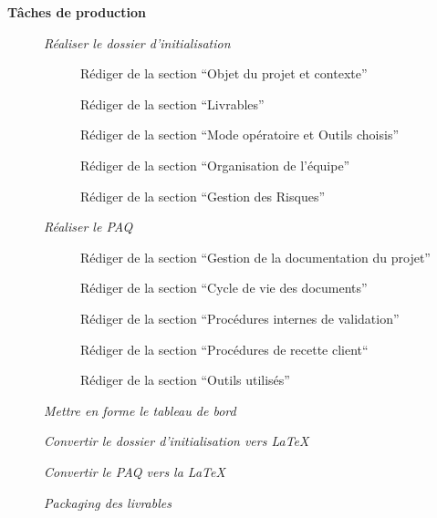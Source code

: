 \begin{description}
    \item[] \bf{Tâches de production}
        \begin{description}
            \item[\textbullet] \it{Réaliser le dossier d’initialisation}
                \begin{description}
                    \item[\textbullet] Rédiger de la section “Objet du projet et contexte”
                    \item[\textbullet] Rédiger de la section “Livrables”
                    \item[\textbullet] Rédiger de la section “Mode opératoire et Outils choisis”
                    \item[\textbullet] Rédiger de la section “Organisation de l’équipe”
                    \item[\textbullet] Rédiger de la section “Gestion des Risques”
                \end{description}
            \item[\textbullet] \it{Réaliser le PAQ}
                \begin{description}
                    \item[\textbullet] Rédiger de la section “Gestion de la documentation du projet”
                    \item[\textbullet] Rédiger de la section “Cycle de vie des documents”
                    \item[\textbullet] Rédiger de la section “Procédures internes de validation”
                    \item[\textbullet] Rédiger de la section “Procédures de recette client“
                    \item[\textbullet] Rédiger de la section “Outils utilisés”
                \end{description}
            \item[\textbullet] \it{Mettre en forme le tableau de bord}
            \item[\textbullet] \it{Convertir le dossier d’initialisation vers LaTeX}
            \item[\textbullet] \it{Convertir le PAQ vers la LaTeX}
            \item[\textbullet] \it{Packaging des livrables} \\
        \end{description}

\end{description}
